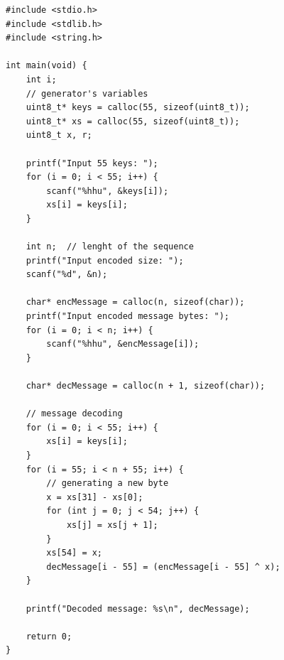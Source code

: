\documentclass[a4paper,10pt]{article}
\begin{document}
\begin{lstlisting}[style = code, title = sg\_decode.c]
#include <stdio.h>
#include <stdlib.h>
#include <string.h>

int main(void) {
    int i;
    // generator's variables
    uint8_t* keys = calloc(55, sizeof(uint8_t));
    uint8_t* xs = calloc(55, sizeof(uint8_t));
    uint8_t x, r;

    printf("Input 55 keys: ");
    for (i = 0; i < 55; i++) {
        scanf("%hhu", &keys[i]);
        xs[i] = keys[i];
    }

    int n;  // lenght of the sequence
    printf("Input encoded size: ");
    scanf("%d", &n);

    char* encMessage = calloc(n, sizeof(char));
    printf("Input encoded message bytes: ");
    for (i = 0; i < n; i++) {
        scanf("%hhu", &encMessage[i]);
    }

    char* decMessage = calloc(n + 1, sizeof(char));

    // message decoding
    for (i = 0; i < 55; i++) {
        xs[i] = keys[i];
    }
    for (i = 55; i < n + 55; i++) {
        // generating a new byte
        x = xs[31] - xs[0];
        for (int j = 0; j < 54; j++) {
            xs[j] = xs[j + 1];
        }
        xs[54] = x;
        decMessage[i - 55] = (encMessage[i - 55] ^ x);
    }

    printf("Decoded message: %s\n", decMessage);

    return 0;
}

\end{lstlisting}
\end{document}
